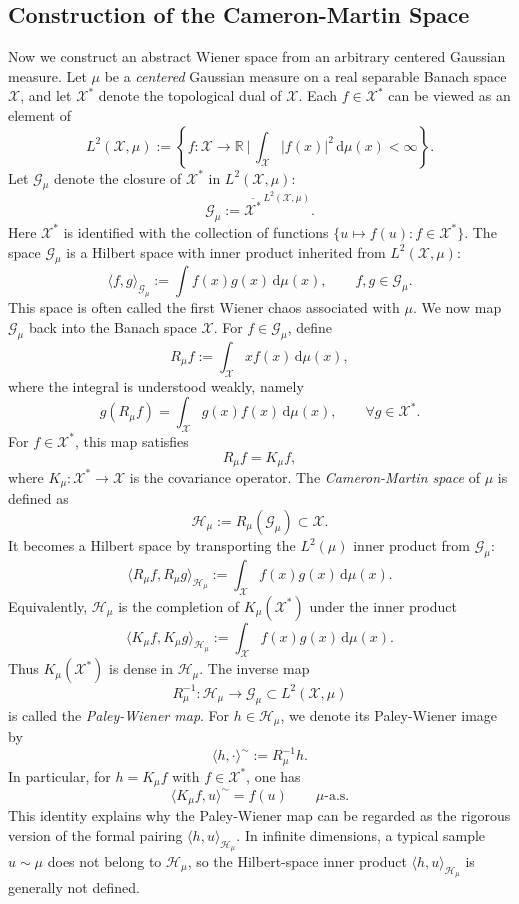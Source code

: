 \documentclass[11pt]{article}
\newcommand{\bbR}{\mathbb{R}}
\renewcommand{\d}{\mathrm{d}}
\begin{document}
\subsection{Construction of the Cameron-Martin Space}
\label{app:cameron_martin_construction}
Now we construct an abstract Wiener space from an arbitrary centered Gaussian measure. Let $\mu$ be a \textit{centered} Gaussian measure on a real separable Banach space $\mathcal X$, and let $\mathcal X^*$ denote the topological dual of $\mathcal X$. Each $f\in\mathcal X^*$ can be viewed as an element of
\begin{equation}
    L^2(\mathcal{X},\mu):=\left\{f:\mathcal{X}\to\bbR\ \Big|\,\int_{\mathcal{X}}\vert f(x)\vert^2\,\d\mu(x)<\infty\right\}.
\end{equation}
Let $\mathcal G_\mu$ denote the closure of $\mathcal X^*$ in $L^2(\mathcal X,\mu)$:
\[
    \mathcal G_\mu
    :=
    \overline{\mathcal X^*}^{\,L^2(\mathcal X,\mu)}.
\]
Here $\mathcal X^*$ is identified with the collection of functions $\{u\mapsto f(u):f\in\mathcal X^*\}$. The space $\mathcal G_\mu$ is a Hilbert space with inner product inherited from $L^2(\mathcal X,\mu)$:
\[
    \langle f,g\rangle_{\mathcal G_\mu}
    :=\int f(x)g(x)\,\d\mu(x),
    \qquad f,g\in\mathcal G_\mu.
\]
This space is often called the first Wiener chaos associated with $\mu$. We now map $\mathcal G_\mu$ back into the Banach space $\mathcal X$. For $f\in\mathcal G_\mu$, define
\[
R_\mu f:=\int_{\mathcal X} xf(x)\,\d\mu(x),
\]
where the integral is understood weakly, namely
\[
    g(R_\mu f)
    =\int_\mathcal{X} g(x)f(x)\,\d\mu(x),
    \qquad \forall g\in\mathcal X^*.
\]
For $f\in\mathcal X^*$, this map satisfies
\[
    R_\mu f = K_\mu f,
\]
where $K_\mu:\mathcal X^*\to\mathcal X$ is the covariance operator. The \textit{Cameron-Martin space} of $\mu$ is defined as
\[
    \mathcal H_\mu
    :=
    R_\mu(\mathcal G_\mu)\subset \mathcal X.
\]
It becomes a Hilbert space by transporting the $L^2(\mu)$ inner product from $\mathcal G_\mu$:
\[
    \langle R_\mu f,R_\mu g\rangle_{\mathcal H_\mu}
    :=
    \int_\mathcal{X} f(x)g(x)\,\d\mu(x).
\]
Equivalently, $\mathcal H_\mu$ is the completion of $K_\mu(\mathcal X^*)$ under the inner product
\[
    \langle K_\mu f,K_\mu g\rangle_{\mathcal H_\mu}
    :=\int_\mathcal{X}f(x)g(x)\,\d\mu(x).
\]
Thus $K_\mu(\mathcal X^*)$ is dense in $\mathcal H_\mu$. The inverse map
\[
    R_\mu^{-1}:\mathcal H_\mu\to \mathcal G_\mu\subset L^2(\mathcal X,\mu)
\]
is called the \textit{Paley-Wiener map}. For $h\in\mathcal H_\mu$, we denote its Paley-Wiener image by
\[
    \langle h,\cdot\rangle^\sim
    :=
    R_\mu^{-1}h.
\]
In particular, for $h=K_\mu f$ with $f\in\mathcal X^*$, one has
\[
    \langle K_\mu f,u\rangle^\sim
    =
    f(u)
    \qquad \mu\text{-a.s.}
\]
This identity explains why the Paley-Wiener map can be regarded as the rigorous version of the formal pairing $\langle h,u\rangle_{\mathcal H_\mu}$. In infinite dimensions, a typical sample $u\sim\mu$ does not belong to $\mathcal H_\mu$, so the Hilbert-space inner product $\langle h,u\rangle_{\mathcal H_\mu}$ is generally not defined.
\end{document}
